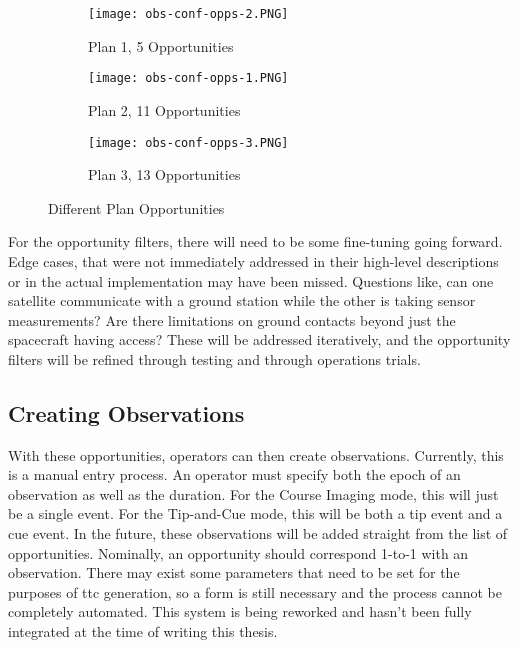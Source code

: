 \begin{figure}[h]
    \centering
    \begin{subfigure}[b]{0.32\textwidth}
	\centering
	\texttt{[image: obs-conf-opps-2.PNG]} 
	\caption{Plan 1, 5 Opportunities}
	\label{fig:obs-conf-opps-1}
    \end{subfigure}
    \hfill
    \begin{subfigure}[b]{0.32\textwidth}
	\centering
	\texttt{[image: obs-conf-opps-1.PNG]} 
	\caption{Plan 2, 11 Opportunities}
	\label{fig:obs-conf-opps-2} 
    \end{subfigure}
    \hfill
    \begin{subfigure}[b]{0.32\textwidth}
	\centering
	\texttt{[image: obs-conf-opps-3.PNG]} 
	\caption{Plan 3, 13 Opportunities}
	\label{fig:obs-conf-opps-3} 
    \end{subfigure}

    \caption{Different Plan Opportunities}
    \label{fig:obs-conf-opps}
\end{figure}

For the opportunity filters, there will need to be some fine-tuning going
forward. Edge cases, that were not immediately addressed in their high-level
descriptions or in the actual implementation may have been missed. Questions
like, can one satellite communicate with a ground station while the other is
taking sensor measurements? Are there limitations on ground contacts beyond
just the spacecraft having access? These will be addressed iteratively, and the
opportunity filters will be refined through testing and through operations
trials.

\subsection{Creating Observations}

With these opportunities, operators can then create observations. Currently,
this is a manual entry process. An operator must specify both the epoch of an
observation as well as the duration. For the Course Imaging mode, this will
just be a single event. For the Tip-and-Cue mode, this will be both a tip event
and a cue event. In the future, these observations will be added straight from
the list of opportunities. Nominally, an opportunity should correspond 1-to-1
with an observation. There may exist some parameters that need to be set for
the purposes of \gls{ttc} generation, so a form is still necessary and the
process cannot be completely automated. This system is being reworked and
hasn't been fully integrated at the time of writing this thesis.


